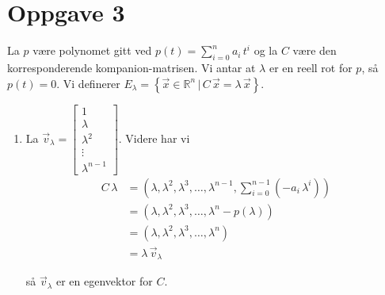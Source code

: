 \documentclass{article}[norsk]
\begin{document}
\section*{Oppgave 3}
La $p$ være polynomet gitt ved $p(t)=\sum_{i=0}^n{a_i\,t^i}$ og la $C$ være den korresponderende kompanion-matrisen. Vi antar at $\lambda$ er en reell rot for $p$, så $p(t)= 0$. Vi definerer $E_\lambda=\left\{\vec{x}\in\mathbb{R}^n\,\lvert\,C\,\vec{x}=\lambda\,\vec{x}\right\}$.
\begin{enumerate}[label=(\textit{\roman*})]
	\item La $\displaystyle\vec{v}_\lambda=\begin{bmatrix}1\\\lambda\\\lambda^2\\\vdots\\\lambda^{n-1}\end{bmatrix}$. Videre har vi 
    \begin{equation*} \begin{aligned}
    	C\,\lambda&=\left(\lambda,\lambda^2,\lambda^3,\ldots,\lambda^{n-1},\sum_{i=0}^{n-1}\left(-a_i\,\lambda^i\right)\right)\\
        &=\left(\lambda,\lambda^2,\lambda^3,\ldots,\lambda^n-p(\lambda)\right)\\
        &=\left(\lambda,\lambda^2,\lambda^3,\ldots,\lambda^n\right)\\
        &=\lambda\,\vec{v}_\lambda
    \end{aligned} \end{equation*}

	så $\vec{v}_\lambda$ er en egenvektor for $C$.
	

\end{enumerate}
\end{document}
